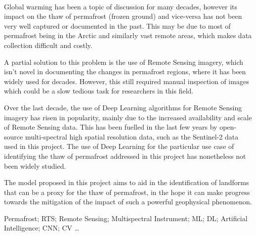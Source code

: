 \paragraph{}
Global warming has been a topic of discussion for many decades, however its impact on the thaw of permafrost (frozen ground) and vice-versa has not been very well captured or documented in the past. This may be due to most of permafrost being in the Arctic and similarly vast remote areas, which makes data collection difficult and costly.

A partial solution to this problem is the use of Remote Sensing imagery, which isn't novel in documenting the changes in permafrost regions, where it has been widely used for decades. However, this still required manual inspection of images which could be a slow tedious task for researchers in this field.

Over the last decade, the use of Deep Learning algorithms for Remote Sensing imagery has risen in popularity, mainly due to the increased availability and scale of Remote Sensing data. This has been fuelled in the last few years by open-source multi-spectral high spatial resolution data, such as the Sentinel-2 data used in this project.
The use of Deep Learning for the particular use case of identifying the thaw of permafrost addressed in this project has nonetheless not been widely studied.

The model proposed in this project aims to aid in the identification of landforms that can be a proxy for the thaw of permafrost, in the hope it can make progress towards the mitigation of the impact of such a powerful geophysical phenomenon.

\begin{keywords}
Permafrost; \gls{RTS}; Remote Sensing;  Multispectral Instrument; \gls{ML}; \gls{DL}; Artificial Intelligence; \gls{CNN}; \gls{CV} \ldots
\end{keywords} 
